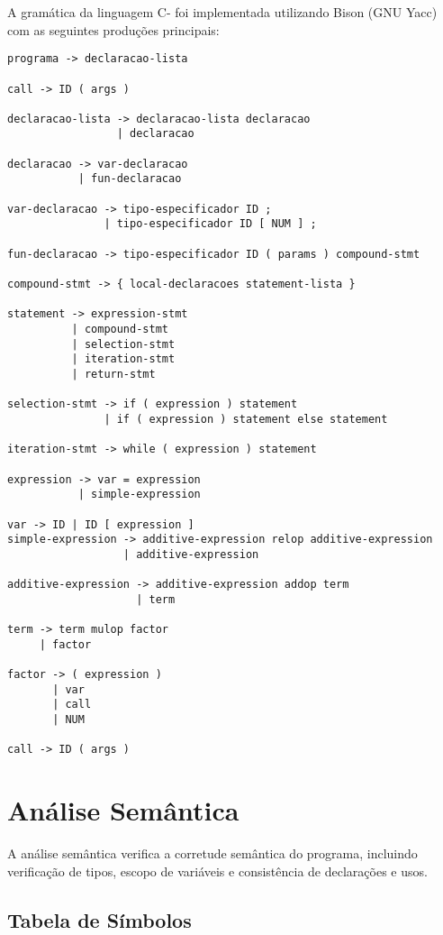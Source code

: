 \documentclass[
	12pt,				%
	oneside,
	a4paper,			%
	english,			%
	french,				%
	spanish,			%
	brazil,				%
	]{abntex2}
\begin{document}
A gramática da linguagem C- foi implementada utilizando Bison (GNU Yacc) com as seguintes produções principais:

\begin{lstlisting}[style=cstyle, caption=Gramática BNF da linguagem C-]
programa -> declaracao-lista

call -> ID ( args )

declaracao-lista -> declaracao-lista declaracao
                 | declaracao

declaracao -> var-declaracao
           | fun-declaracao

var-declaracao -> tipo-especificador ID ;
               | tipo-especificador ID [ NUM ] ;

fun-declaracao -> tipo-especificador ID ( params ) compound-stmt

compound-stmt -> { local-declaracoes statement-lista }

statement -> expression-stmt
          | compound-stmt  
          | selection-stmt
          | iteration-stmt
          | return-stmt

selection-stmt -> if ( expression ) statement
               | if ( expression ) statement else statement

iteration-stmt -> while ( expression ) statement

expression -> var = expression
           | simple-expression

var -> ID | ID [ expression ]
simple-expression -> additive-expression relop additive-expression
                  | additive-expression

additive-expression -> additive-expression addop term
                    | term

term -> term mulop factor
     | factor

factor -> ( expression )
       | var
       | call
       | NUM

call -> ID ( args )
\end{lstlisting}

\section{Análise Semântica}

A análise semântica verifica a corretude semântica do programa, incluindo verificação de tipos, escopo de variáveis e consistência de declarações e usos.

\subsection{Tabela de Símbolos}
\end{document}
